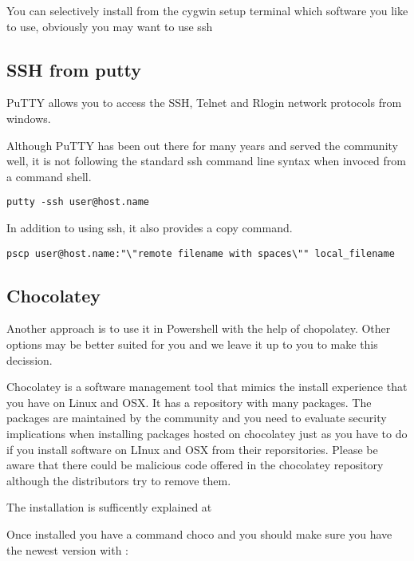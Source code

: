 You can selectively install from the cygwin setup terminal which
software you like to use, obviously you may want to use ssh

\subsection{SSH from putty}

PuTTY allows you to access the SSH, Telnet and Rlogin network
protocols from windows. 


Although PuTTY has been out there for many years and served the
community well, it is not following the standard ssh command line
syntax when invoced from a command shell.

\begin{verbatim}
putty -ssh user@host.name
\end{verbatim}

In addition to using ssh, it also provides a copy command.

\begin{verbatim}
pscp user@host.name:"\"remote filename with spaces\"" local_filename
\end{verbatim}

\subsection{Chocolatey}

Another approach is to use it in Powershell with the help of
chopolatey. Other options may be better suited for you and we leave it
up to you to make this decission. 

Chocolatey is a software management tool that mimics the install
experience that you have on Linux and OSX. It has a repository with
many packages. The packages are maintained by the community and you
need to evaluate security implications when installing packages hosted
on chocolatey just as you have to do if you install software on LInux
and OSX from their reporsitories.  Please be aware that there could be
malicious code offered in the chocolatey repository although the
distributors try to remove them.

The installation is sufficently explained at


Once installed you have a command choco and you should make sure you
have the newest version with :

